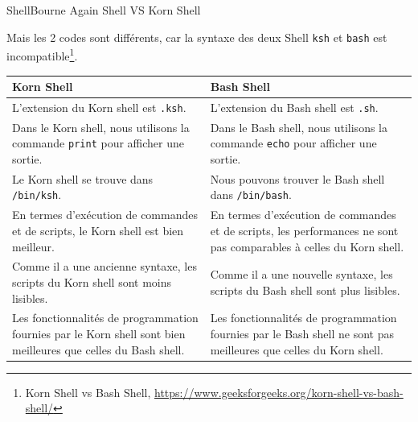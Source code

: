 \documentclass{beamer}
\begin{document}
    \begin{frame}{Shell}{Bourne Again Shell VS Korn Shell}
        \begin{tiny}
            Mais les 2 codes sont différents, car la syntaxe des deux Shell \lstinline{ksh} et \lstinline{bash} est incompatible\footnote{Korn Shell vs Bash Shell, \url{https://www.geeksforgeeks.org/korn-shell-vs-bash-shell/}}.
            \begin{table}[h!]
                \centering
                \begin{tabular}{|p{5.5cm}|p{5.5cm}|}
                    \hline
                    \textbf{Korn Shell}                                                                                            & \textbf{Bash Shell}                                                                                                \\
                    \hline
                    L'extension du Korn shell est \texttt{.ksh}.                                                                   & L'extension du Bash shell est \texttt{.sh}.                                                                        \\
                    \hline
                    Dans le Korn shell, nous utilisons la commande \texttt{print} pour afficher une sortie. & Dans le Bash shell, nous utilisons la commande \texttt{echo} pour afficher une sortie. \\
                    \hline
                    Le Korn shell se trouve dans \texttt{/bin/ksh}.                                                                & Nous pouvons trouver le Bash shell dans \texttt{/bin/bash}.                                                        \\
                    \hline
                    En termes d'exécution de commandes et de scripts, le Korn shell est bien meilleur. & En termes d'exécution de commandes et de scripts, les performances ne sont pas comparables à celles du Korn shell. \\
                    \hline
                    Comme il a une ancienne syntaxe, les scripts du Korn shell sont moins lisibles.                                & Comme il a une nouvelle syntaxe, les scripts du Bash shell sont plus lisibles.                                     \\
                    \hline
                    Les fonctionnalités de programmation fournies par le Korn shell sont bien meilleures que celles du Bash shell. & Les fonctionnalités de programmation fournies par le Bash shell ne sont pas meilleures que celles du Korn shell. \\

\end{tabular}
\end{table}
\end{tiny}
\end{frame}
\end{document}
